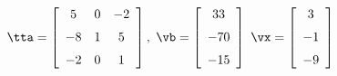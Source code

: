 {$\tta = \left[ \begin {array}{ccc} 5&0&-2\\\noalign{\medskip}-8&1&5
\\\noalign{\medskip}-2&0&1\end {array} \right] ,$
 \quad
$\vb = \left[ \begin {array}{c} 33\\\noalign{\medskip}-70
\\\noalign{\medskip}-15\end {array} \right]$ 
}
{$\vx = \left[ \begin {array}{c} 3\\\noalign{\medskip}-1\\\noalign{\medskip}-
9\end {array} \right]$}
